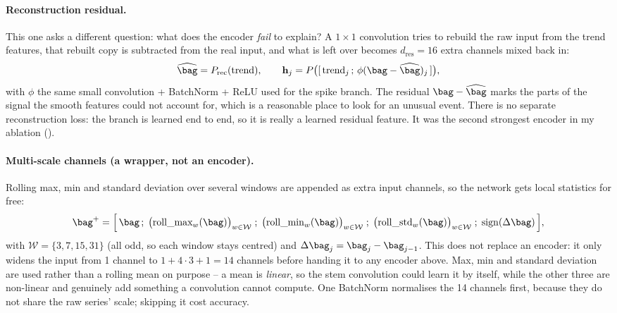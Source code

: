 \paragraph{Reconstruction residual.}
This one asks a different question: what does the encoder \emph{fail} to explain? A $1\times1$
convolution tries to rebuild the raw input from the trend features, that rebuilt copy is subtracted
from the real input, and what is left over becomes $d_{\text{res}} = 16$ extra channels mixed back
in:
\begin{equation}
  \widehat{\bag} = P_{\text{rec}}(\text{trend}), \qquad
  \mathbf{h}_j = P\big([\,\text{trend}_j \,;\, \phi(\bag - \widehat{\bag})_j\,]\big),
  \label{eq:recon}
\end{equation}
with $\phi$ the same small convolution + BatchNorm + ReLU used for the spike branch. The residual
$\bag - \widehat{\bag}$ marks the parts of the signal the smooth features could not account for,
which is a reasonable place to look for an unusual event. There is no separate reconstruction loss:
the branch is learned end to end, so it is really a learned residual feature. It was the second
strongest encoder in my ablation ().

\paragraph{Multi-scale channels (a wrapper, not an encoder).}
Rolling max, min and standard deviation over several windows are appended as extra input channels,
so the network gets local statistics for free:
\begin{equation}
  \bag^{+} = \Big[\, \bag \,;\; \big(\text{roll\_max}_w(\bag)\big)_{w \in \mathcal{W}} \;;\;
  \big(\text{roll\_min}_w(\bag)\big)_{w \in \mathcal{W}} \;;\;
  \big(\text{roll\_std}_w(\bag)\big)_{w \in \mathcal{W}} \;;\; \operatorname{sign}(\Delta \bag) \,\Big] ,
  \label{eq:mschan}
\end{equation}
with $\mathcal{W} = \{3,7,15,31\}$ (all odd, so each window stays centred) and
$\Delta \bag_j = \bag_j - \bag_{j-1}$. This does not replace an encoder: it only widens the input
from 1 channel to $1 + 4 \cdot 3 + 1 = 14$ channels before handing it to any encoder above. Max, min
and standard deviation are used rather than a rolling mean on purpose -- a mean is \emph{linear}, so
the stem convolution could learn it by itself, while the other three are non-linear and genuinely
add something a convolution cannot compute. One BatchNorm normalises the 14 channels first, because
they do not share the raw series' scale; skipping it cost accuracy.

